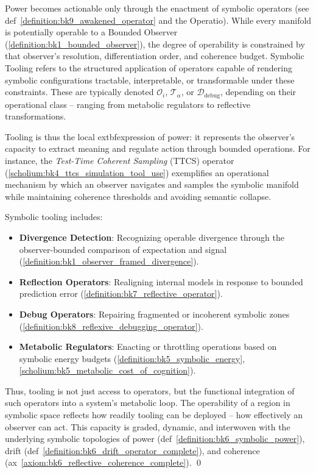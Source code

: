 \begin{tcolorbox}[colback=blue!5!white, colframe=blue!75!black, title=Definition: Symbolic Operation]
\label{definition:bk7_symbolic_operation}
Power becomes actionable only through the enactment of symbolic operators (see def~\ref{definition:bk9_awakened_operator} and the Operatio). While every manifold is potentially operable to a Bounded Observer (\ref{definition:bk1_bounded_observer}), the degree of operability is constrained by that observer's resolution, differentiation order, and coherence budget. Symbolic Tooling refers to the structured application of operators capable of rendering symbolic configurations tractable, interpretable, or transformable under these constraints. These are typically denoted \(\mathcal{O}_i\), \(\mathcal{T}_\alpha\), or \(\mathcal{D}_{\text{debug}}\), depending on their operational class -- ranging from metabolic regulators to reflective transformations.

Tooling is thus the local 	extbf{expression of power}: it represents the observer's capacity to extract meaning and regulate action through bounded operations. For instance, the \emph{Test-Time Coherent Sampling} (TTCS) operator (\ref{scholium:bk4_ttcs_simulation_tool_use}) exemplifies an operational mechanism by which an observer navigates and samples the symbolic manifold while maintaining coherence thresholds and avoiding semantic collapse.

Symbolic tooling includes:
\begin{itemize}
    \item \textbf{Divergence Detection}: Recognizing operable divergence through the observer-bounded comparison of expectation and signal (\ref{definition:bk1_observer_framed_divergence}).
    \item \textbf{Reflection Operators}: Realigning internal models in response to bounded prediction error (\ref{definition:bk7_reflective_operator}).
    \item \textbf{Debug Operators}: Repairing fragmented or incoherent symbolic zones (\ref{definition:bk8_reflexive_debugging_operator}).
    \item \textbf{Metabolic Regulators}: Enacting or throttling operations based on symbolic energy budgets (\ref{definition:bk5_symbolic_energy}, \ref{scholium:bk5_metabolic_cost_of_cognition}).
\end{itemize}

Thus, tooling is not just access to operators, but the functional integration of such operators into a system's metabolic loop. The operability of a region in symbolic space reflects how readily tooling can be deployed -- how effectively an observer can act. This capacity is graded, dynamic, and interwoven with the underlying symbolic topologies of power (def~\ref{definition:bk6_symbolic_power}), drift (def~\ref{definition:bk6_drift_operator_complete}), and coherence (ax~\ref{axiom:bk6_reflective_coherence_complete}). \qed
\end{tcolorbox}

